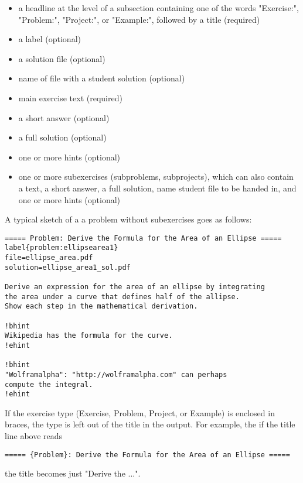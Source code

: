 \documentclass[%
oneside,                 %
final,                   %
10pt]{article}
\begin{document}
\begin{itemize}
  \item a headline at the level of a subsection
    containing one of the words "Exercise:", "Problem:",
    "Project:", or "Example:", followed by a title (required)

  \item a label (optional)

  \item a solution file (optional)

  \item name of file with a student solution (optional)

  \item main exercise text (required)

  \item a short answer (optional)

  \item a full solution (optional)

  \item one or more hints (optional)

  \item one or more subexercises (subproblems, subprojects), which can also
    contain a text, a short answer, a full solution, name student file
    to be handed in, and one or more hints (optional)
\end{itemize}

\noindent
A typical sketch of a a problem without subexercises goes as follows:
\begin{Verbatim}[numbers=none,fontsize=\fontsize{9pt}{9pt},baselinestretch=0.85,xleftmargin=0mm]
===== Problem: Derive the Formula for the Area of an Ellipse =====
label{problem:ellipsearea1}
file=ellipse_area.pdf
solution=ellipse_area1_sol.pdf

Derive an expression for the area of an ellipse by integrating
the area under a curve that defines half of the allipse.
Show each step in the mathematical derivation.

!bhint
Wikipedia has the formula for the curve.
!ehint

!bhint
"Wolframalpha": "http://wolframalpha.com" can perhaps
compute the integral.
!ehint
\end{Verbatim}
If the exercise type (Exercise, Problem, Project, or Example)
is enclosed in braces, the type is left out of the title in the
output. For example, the if the title line above reads

\begin{Verbatim}[numbers=none,fontsize=\fontsize{9pt}{9pt},baselinestretch=0.85,xleftmargin=0mm]
===== {Problem}: Derive the Formula for the Area of an Ellipse =====
\end{Verbatim}
the title becomes just "Derive the ...".
\end{document}
